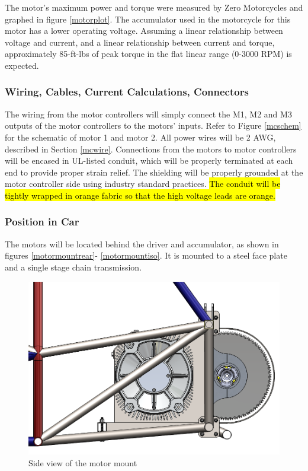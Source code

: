 \documentclass{article}
\DeclareRobustCommand{\hlr}[1]{{\sethlcolor{red}\hl{#1}}}
\begin{document}
            The motor's maximum power and torque were measured by Zero Motorcycles and graphed in figure \ref{motorplot}. The accumulator used in the motorcycle for this motor has a lower operating voltage. Assuming a linear relationship between voltage and current, and a linear relationship between current and torque, approximately 85-ft-lbs of peak torque in the flat linear range (0-3000 RPM) is expected.

        \subsubsection{Wiring, Cables, Current Calculations, Connectors} \label{motorswiring}


            The wiring from the motor controllers will simply connect the M1, M2 and M3 outputs of the motor controllers to the motors' inputs. Refer to Figure \ref{mcschem} for the schematic of motor 1 and motor 2. All power wires will be 2 AWG, described in Section \ref{mcwire}.
            Connections from the motors to motor controllers will be encased in UL-listed conduit, which will be properly terminated at each end to provide proper strain relief. The shielding will be properly grounded at the motor controller side using industry standard practices. \hlr{The conduit will be tightly wrapped in orange fabric so that the high voltage leads are orange.}

        \subsubsection{Position in Car}

            The motors will be located behind the driver and accumulator, as shown in figures \ref{motormountrear}- \ref{motormountiso}. It is mounted to a steel face plate and a single stage chain transmission.

            \begin{figure}[H]
                \centering
                \includegraphics[width = 0.6 \textwidth]{motormount_sideview}
                \caption{Side view of the motor mount}
                \label{motormountside}
            \end{figure}
\end{document}
